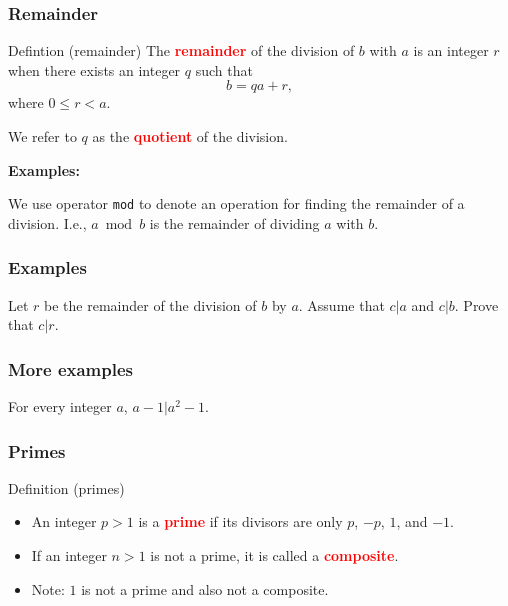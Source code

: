 \begin{frame}
  \frametitle{Remainder}

  \begin{block}{Defintion (remainder)}
    The \textcolor{red}{\bf remainder} of the division of $b$ with $a$
    is an integer $r$ when there exists an integer $q$ such that
    \[
    b = qa + r,
    \]
    where $0\leq r < a$.

    \pause We refer to $q$ as the \textcolor{red}{\bf quotient} of the
      division.
  \end{block}

  \pause

  {\bf Examples:}
  \vspace{.5in}

  \pause We use operator {\tt mod} to denote an operation for finding
  the remainder of a division.  I.e., $a \bmod b$ is the remainder of
  dividing $a$ with $b$.
\end{frame}

\begin{frame}
  \frametitle{Examples}

  Let $r$ be the remainder of the division of $b$ by $a$.  Assume that
  $c|a$ and $c|b$.  Prove that $c|r$.

  \vspace{2.5in}
\end{frame}

\begin{frame}
  \frametitle{More examples}

  For every integer $a$, $a-1 | a^2-1$.

  \vspace{2.5in}
\end{frame}


\begin{frame}
  \frametitle{Primes}

  \begin{block}{Definition (primes)}
    \begin{itemize}
    \item An integer $p>1$ is a \textcolor{red}{\bf prime} if its
      divisors are only $p$, $-p$, $1$, and $-1$.
    \item If an integer $n>1$ is not a prime, it is called a
      \textcolor{red}{\bf composite}.
    \item Note: $1$ is not a prime and also not a composite.
    \end{itemize}
  \end{block}

\end{frame}

